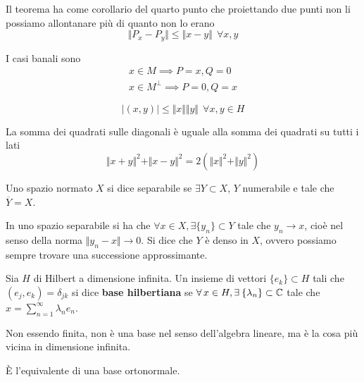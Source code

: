 Il teorema ha come corollario del quarto punto che proiettando due punti non li possiamo allontanare più di quanto non lo erano
\begin{equation*}
\Vert P_{x} - P_{y} \Vert \leq \Vert x - y \Vert \ \ \forall x, y
\end{equation*}
\begin{rem}
I casi banali sono
\begin{gather*}
x\in M\implies P = x, Q = 0\\
x\in M^{\perp} \implies P = 0, Q = x
\end{gather*}
\end{rem}
\begin{thm}
\begin{equation*}
| (x, y)| \leq \Vert x \Vert \Vert y \Vert \ \ \forall x, y\in H
\end{equation*}
\end{thm}
\begin{thm}
 La somma dei quadrati sulle diagonali è uguale alla somma dei quadrati su tutti i lati
\begin{equation*}
\Vert x + y \Vert^{2} + \Vert x - y \Vert^{2} = 2\left( \Vert x \Vert^{2} + \Vert y \Vert^{2}\right)
\end{equation*}
\end{thm}
\begin{defn}
Uno spazio normato $X$ si dice separabile se $\exists Y\subset X$, $Y$ numerabile e tale che $\overline{Y} = X$.
\end{defn}
In uno spazio separabile si ha che $\forall x\in X, \exists \{y_{n}\} \subset Y$ tale che $y_{n}\rightarrow x$, cioè nel senso della norma $ \Vert y_{n} - x \Vert \rightarrow 0$. Si dice che $Y$ è denso in $X$, ovvero possiamo sempre trovare una successione approssimante.
\begin{defn}
Sia $H$ di Hilbert a dimensione infinita. Un insieme di vettori $\{e_{k}\} \subset H$ tali che $(e_{j}, e_{k}) = \delta_{jk}$ si dice \textbf{base hilbertiana} se $\forall x\in H, \exists \{\lambda_{n}\} \subset \CC$ tale che $x = \sum^{\infty}_{n = 1} \lambda_{n} e_{n}$.
\end{defn}
\begin{rem}
Non essendo finita, non è una base nel senso dell'algebra lineare, ma è la cosa più vicina in dimensione infinita.
\end{rem}
\begin{rem}
È l'equivalente di una base ortonormale.
\end{rem}
